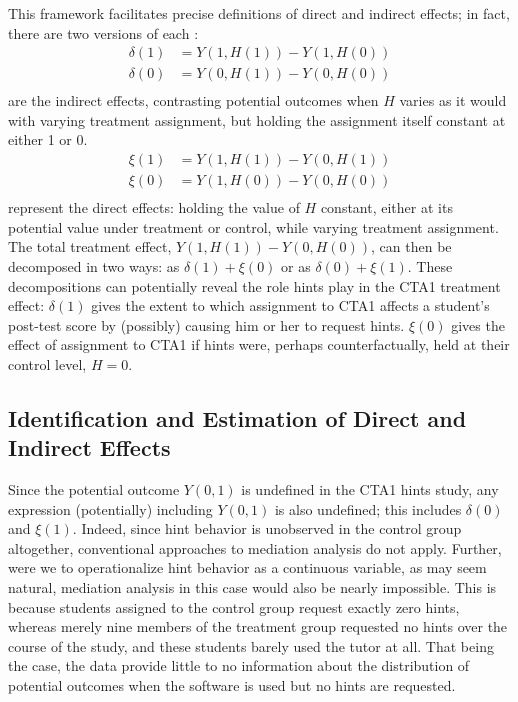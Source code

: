 \documentclass{article}
\begin{document}
This framework facilitates precise definitions of direct and indirect
effects; in fact, there are two versions of each \cite[e.g.][]{imai2011unpacking}:
\begin{align*}
\delta(1)&=Y(1,H(1))-Y(1,H(0))\\
\delta(0)&=Y(0,H(1))-Y(0,H(0))\\
\end{align*}
are the indirect effects, contrasting potential outcomes when $H$
varies as it would with varying treatment assignment, but holding the
assignment itself constant at either 1 or 0.
\begin{align*}
\xi(1)&=Y(1,H(1))-Y(0,H(1))\\
\xi(0)&=Y(1,H(0))-Y(0,H(0))\\
\end{align*}
represent the direct effects: holding the value of $H$ constant,
either at its potential value under treatment or control, while
varying treatment assignment.
The total treatment effect, $Y(1,H(1))-Y(0,H(0))$, can then be
decomposed in two ways: as $\delta(1)+\xi(0)$ or as
$\delta(0)+\xi(1)$.
These decompositions can potentially reveal the role hints play in the
CTA1 treatment effect: $\delta(1)$ gives the extent to which
assignment to CTA1 affects a student's post-test score by (possibly)
causing him or her to request hints.
$\xi(0)$ gives the effect of assignment to CTA1 if hints were,
perhaps counterfactually, held at their control level, $H=0$.


\subsection{Identification and Estimation of Direct and Indirect
  Effects}

Since the potential outcome $Y(0,1)$ is undefined in the CTA1 hints
study, any expression (potentially) including $Y(0,1)$ is also
undefined; this includes $\delta(0)$ and $\xi(1)$.
Indeed, since hint behavior is unobserved in the control group
altogether, conventional approaches to mediation analysis do not
apply.
Further, were we to operationalize hint behavior as a continuous
variable, as may seem natural, mediation analysis in this case would
also be nearly impossible.
This is because students assigned to the control group request exactly
zero hints, whereas merely nine members of the treatment group
requested no hints over the course of the study, and these students
barely used the tutor at all.
That being the case, the data provide little to no information about
the distribution of potential outcomes when the software is used
but no hints are requested.
\end{document}
